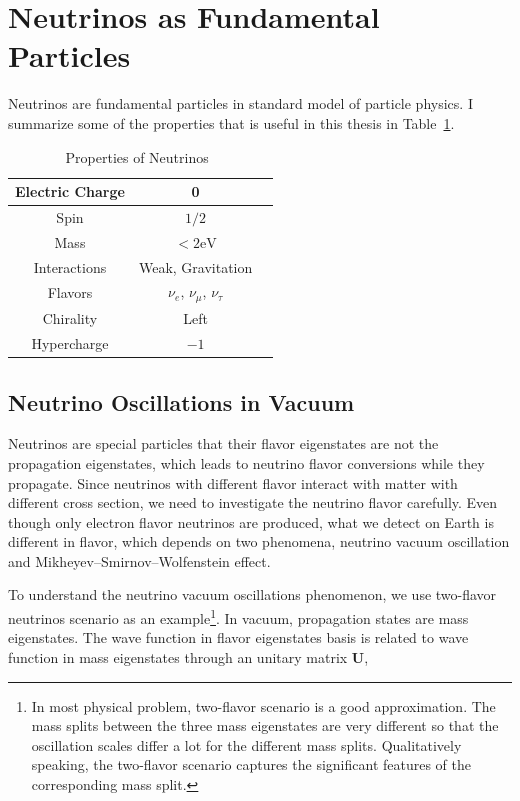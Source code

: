 \section{\label{chap:basics-section:neutrinos}Neutrinos as Fundamental Particles}

Neutrinos are fundamental particles in standard model of particle physics. I summarize some of the properties that is useful in this thesis in Table~\ref{table:neutrino-properties}.

\begin{table}[ht]
\centering
 \begin{tabular}{|c | c | c|} 
 \hline
  Electric Charge & 0\\
  \hline
  Spin & $1/2$ \\
\hline
 Mass & $<2\mathrm{eV}$  \\
 \hline
 Interactions & Weak, Gravitation  \\
 \hline
 Flavors & $\nu_e$, $\nu_\mu$, $\nu_\tau$ \\ 
 \hline
 Chirality & Left \\
 \hline
 Hypercharge & $-1$ \\
 \hline
 
 \end{tabular}
 \caption{Properties of Neutrinos~\cite{Patrignani:2016xqp}}
\label{table:neutrino-properties}
\end{table}


\subsection{Neutrino Oscillations in Vacuum}

Neutrinos are special particles that their flavor eigenstates are not the propagation eigenstates, which leads to neutrino flavor conversions while they propagate. Since neutrinos with different flavor interact with matter with different cross section, we need to investigate the neutrino flavor carefully. Even though only electron flavor neutrinos are produced, what we detect on Earth is different in flavor, which depends on two phenomena, neutrino vacuum oscillation and Mikheyev–Smirnov–Wolfenstein effect.


To understand the neutrino vacuum oscillations phenomenon, we use two-flavor neutrinos scenario as an example\footnote{In most physical problem, two-flavor scenario is a good approximation. The mass splits between the three mass eigenstates are very different so that the oscillation scales differ a lot for the different mass splits. Qualitatively speaking, the two-flavor scenario captures the significant features of the corresponding mass split.}. In vacuum, propagation states are mass eigenstates. The wave function in flavor eigenstates basis is related to wave function in mass eigenstates through an unitary matrix $\mathbf U$,

